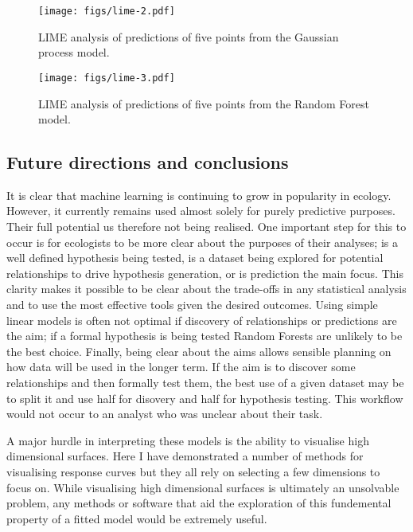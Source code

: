 \documentclass[10pt,]{article}
\begin{document}
\begin{figure}[htbp]
\centering
\texttt{[image: figs/lime-2.pdf]}
\caption{LIME analysis of predictions of five points from the Gaussian process model.\protect\label{fig:limegp}}
\end{figure}

\begin{figure}[htbp]
\centering
\texttt{[image: figs/lime-3.pdf]}
\caption{LIME analysis of predictions of five points from the Random Forest model.\protect\label{fig:limerf}}
\end{figure}

\subsection{Future directions and conclusions}\label{future-directions-and-conclusions}

It is clear that machine learning is continuing to grow in popularity in ecology. However, it currently remains used almost solely for purely predictive purposes. Their full potential us therefore not being realised. One important step for this to occur is for ecologists to be more clear about the purposes of their analyses; is a well defined hypothesis being tested, is a dataset being explored for potential relationships to drive hypothesis generation, or is prediction the main focus. This clarity makes it possible to be clear about the trade-offs in any statistical analysis and to use the most effective tools given the desired outcomes. Using simple linear models is often not optimal if discovery of relationships or predictions are the aim; if a formal hypothesis is being tested Random Forests are unlikely to be the best choice. Finally, being clear about the aims allows sensible planning on how data will be used in the longer term. If the aim is to discover some relationships and then formally test them, the best use of a given dataset may be to split it and use half for disovery and half for hypothesis testing. This workflow would not occur to an analyst who was unclear about their task.

A major hurdle in interpreting these models is the ability to visualise high dimensional surfaces. Here I have demonstrated a number of methods for visualising response curves but they all rely on selecting a few dimensions to focus on. While visualising high dimensional surfaces is ultimately an unsolvable problem, any methods or software that aid the exploration of this fundemental property of a fitted model would be extremely useful.
\end{document}
